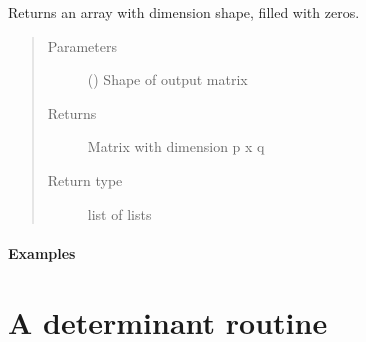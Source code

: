 \documentclass[letterpaper,10pt,english]{sphinxmanual}
\begin{document}
\begin{fulllineitems}
Returns an array with dimension shape, filled with zeros.
\begin{quote}\begin{description}
\item[{Parameters}] \leavevmode
{} () \textendash{} Shape of output matrix

\item[{Returns}] \leavevmode
{} \textendash{} Matrix with dimension p x q

\item[{Return type}] \leavevmode
list of lists

\end{description}\end{quote}
\subsubsection*{Examples}

\begin{sphinxVerbatim}[commandchars=\\\{\}]
 
 
 
\end{sphinxVerbatim}

\end{fulllineitems}



\chapter{A determinant routine}
\label{\detokenize{index:a-determinant-routine}}
\end{document}
